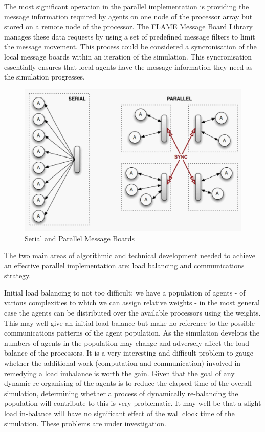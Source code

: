 The most significant operation in the parallel implementation is providing the message information required by agents on one node of the processor array but stored on a remote node of the processor. The FLAME Message Board Library manages these data requests by using a set of predefined message filters to limit the message movement. This process could be considered a syncronisation of the local message boards within an iteration of the simulation. This syncronisation essentially ensures that local agents have the message information they need as the simulation progresses.
\begin{figure}[h]
	\centering
		\includegraphics[scale=0.25]{flame.jpg}
	\caption{Serial and Parallel Message Boards}
	\label{fig:Figure2}
\end{figure}
The two main areas of algorithmic and technical development needed to achieve an effective parallel implementation are: load balancing and communications strategy. 

Initial load balancing to not too difficult: we have a population of agents - of various complexities to which we can assign relative weights - in the most general case the agents can be distributed over the available processors using the weights. This may well give an initial load balance but make no reference to the possible communications patterns of the agent population. As the simulation develops the numbers of agents in the population may change and adversely affect the load balance of the processors. It is a very interesting and difficult problem to gauge whether the additional work (computation and communication) involved in remedying a load imbalance  is worth the gain. Given that the goal of any dynamic re-organising of the agents is to reduce the elapsed time of the overall simulation, determining whether a process of dynamically re-balancing the population will contribute to this is very problematic. It may well be that a slight load in-balance will have no significant effect of the wall clock time of the simulation. These problems are under investigation.

